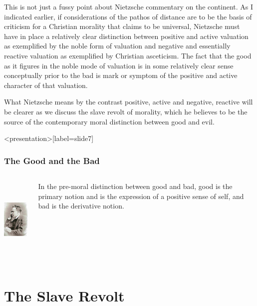 This is not just a fussy point about Nietzsche commentary on the continent. As I indicated earlier, if considerations of the pathos of distance are to be the basis of criticism for a Christian morality that claims to be universal, Nietzsche must have in place a relatively clear distinction between positive and active valuation as exemplified by the noble form of valuation and negative and essentially reactive valuation as exemplified by Christian asceticism. The fact that the good as it figures in the noble mode of valuation is in some relatively clear sense conceptually prior to the bad is mark or symptom of the positive and active character of that valuation.

What Nietzsche means by the contrast positive, active and negative, reactive will be clearer as we discuss the slave revolt of morality, which he believes to be the source of the contemporary moral distinction between good and evil. \change

\begin{frame}<presentation>[label=slide7]
    \frametitle{The Good and the Bad}
        \begin{columns}
            \begin{column}{3cm}
                \includegraphics[height=4cm]{../../../graphics/nietzsche.jpg}
            \end{column}
            \begin{column}{7cm}
                In the pre-moral distinction between good and bad, \alert{good} is the primary notion and is the expression of a positive sense of self, and \alert{bad} is the derivative notion.
            \end{column}
        \end{columns}
\end{frame}


\section{The Slave Revolt}\label{sec:the_slave_revolt} %

